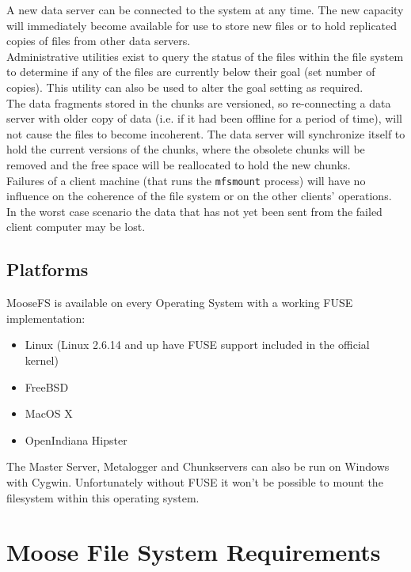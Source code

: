 \documentclass[a4paper,11pt,english]{report}
\def\code#1{\texttt{#1}}
\begin{document}
		A new data server can be connected to the system at any time.  The new capacity will immediately become available for use to store new files or to hold replicated copies of files from other data servers.\\
		
		Administrative utilities exist to query the status of the files within the file system to determine if any of the files are currently below their goal (set number of copies). This utility can also be used to alter the goal setting as required.\\
		
		The data fragments stored in the chunks are versioned, so re-connecting a data server with older copy of data (i.e. if it had been offline for a period of time), will not cause the files to become incoherent. The data server will synchronize itself to hold the current versions of the chunks, where the obsolete chunks will be removed and the free space will be reallocated to hold the new chunks.\\
		
		Failures of a client machine (that runs the \code{mfsmount} process) will have no influence on the coherence of the file system or on the other clients' operations. In the worst case scenario the data that has not yet been sent from the failed client computer may be lost.
		
		\section{Platforms}
		MooseFS is available on every Operating System with a working FUSE implementation:
		\begin{itemize}
			\item Linux (Linux 2.6.14 and up have FUSE support included in the official kernel)
			\item FreeBSD
			\item MacOS X
			\item OpenIndiana Hipster
		\end{itemize}
	
		\bigskip	
		The Master Server, Metalogger and Chunkservers can also be run on Windows with Cygwin. Unfortunately without FUSE it won't be possible to mount the filesystem within this operating system.


	\chapter{Moose File System Requirements}
\end{document}
